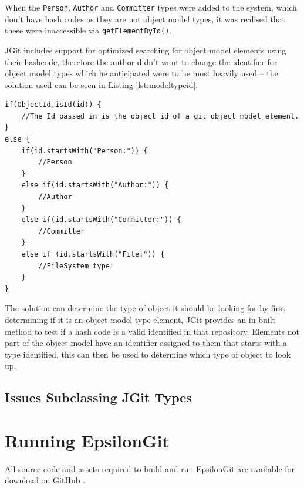 \documentclass[11pt]{book}
\newcommand{\code}[1]{\texttt{#1}}
\begin{document}
When the \code{Person}, \code{Author} and \code{Committer} types were added to the system, which don't have hash codes as they are not object model types, it was realised that these were inaccessible via \code{getElementById()}. 

JGit includes support for optimized searching for object model elements using their hashcode, therefore the author didn't want to change the identifier for object model types which he anticipated were to be most heavily used -- the solution used can be seen in Listing \ref{lst:modeltypeid}. \\

\begin{lstlisting}[caption=Determining the type of model element by its ID, label=lst:modeltypeid]
if(ObjectId.isId(id)) {
	//The Id passed in is the object id of a git object model element.
}
else {
	if(id.startsWith("Person:")) {
		//Person
	}
	else if(id.startsWith("Author:")) {
		//Author
	}
	else if(id.startsWith("Committer:")) {
		//Committer
	}
	else if (id.startsWith("File:")) {
		//FileSystem type
	}
}
\end{lstlisting}

The solution can determine the type of object it should be looking for by first determining if it is an object-model type element, JGit provides an in-built method to test if a hash code is a valid identified in that repository. Elements not part of the object model have an identifier assigned to them that starts with a type identified, this can then be used to determine which type of object to look up.

\subsection{Issues Subclassing JGit Types}

	
\section{Running EpsilonGit}
All source code and assets required to build and run EpsilonGit are available for download on GitHub \cite{epsilongitgithub}. 
\end{document}
